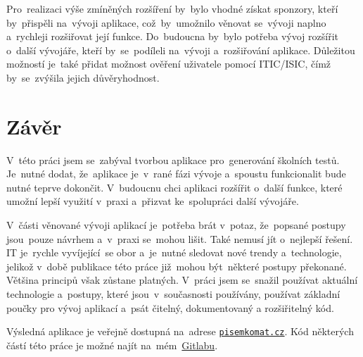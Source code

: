 \documentclass[10pt,a4paper]{article}
\begin{document}
        Pro~realizaci výše zmíněných rozšíření by~bylo vhodné získat sponzory, kteří by~přispěli na~vývoji aplikace, což~by~umožnilo věnovat se~vývoji naplno a~rychleji rozšiřovat její funkce. Do~budoucna by~bylo potřeba vývoj rozšířit o~další vývojáře, kteří by~se~podíleli na~vývoji a~rozšiřování aplikace. Důležitou možností je~také přidat možnost ověření uživatele pomocí ITIC/ISIC, čímž by~se~zvýšila jejich důvěryhodnost.

	\section{Závěr}
        V~této práci jsem se~zabýval tvorbou aplikace pro~generování školních testů. Je~nutné dodat, že~aplikace je~v~rané fázi vývoje a~spoustu funkcionalit bude nutné teprve dokončit. V~budoucnu chci aplikaci rozšířit o~další funkce, které umožní lepší využití v~praxi a~přizvat ke~spolupráci další vývojáře.

        V~části věnované vývoji aplikací je~potřeba brát v~potaz, že~popsané postupy jsou~pouze návrhem a~v~praxi se~mohou lišit. Také nemusí jít o~nejlepší řešení. IT je~rychle vyvíjející~se obor a~je~nutné sledovat nové trendy a~technologie, jelikož v~době publikace této práce již~mohou být~některé postupy překonané. Většina principů však zůstane platných. V~práci jsem se~snažil používat aktuální technologie a~postupy, které jsou~v~současnosti používány, používat základní poučky pro vývoj aplikací a~psát čitelný, dokumentovaný a rozšiřitelný kód.

        Výsledná aplikace je veřejně dostupná na~adrese \href{https://pisemkomat.cz}{\texttt{pisemkomat.cz}}. Kód některých částí této práce je možné najít na~mém~\href{https://gitlab.com/sjiamnocna}{Gitlabu}.

    \newpage
    \printbibliography
\end{document}
